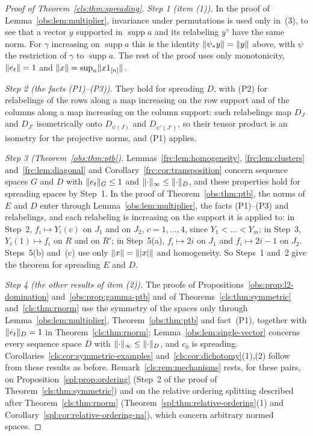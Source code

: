 \begin{proof}[Proof of Theorem~\ref{cls:thm:spreading}]
\emph{Step 1 (item (1)).} In the proof of Lemma~\ref{obs:lem:multiplier}, invariance under permutations is used only
in~(3), to see that a vector $y$ supported in $\operatorname{supp}a$ and its relabeling $y^\gamma$ have the same norm.
For $\gamma$ increasing on $\operatorname{supp}a$ this is the identity $\lVert \psi_*y\rVert=\lVert y\rVert$ above, with $\psi$ the
restriction of $\gamma$ to $\operatorname{supp}a$. The rest of the proof uses only monotonicity, $\lVert e_t\rVert=1$ and
$\lVert x\rVert=\sup_n\lVert x1_{[n]}\rVert$.

\emph{Step 2 (the facts (P1)--(P3)).} They hold for spreading $D$, with (P2) for relabelings of the rows along a map
increasing on the row support and of the columns along a map increasing on the column support: such relabelings map
$D_J$ and $D_{J'}$ isometrically onto $D_{\psi(J)}$ and $D_{\psi'(J')}$, so their tensor product is an isometry for the
projective norms, and (P1) applies.

\emph{Step 3 (Theorem~\ref{obs:thm:ptb}).} Lemmas~\ref{frc:lem:homogeneity}, \ref{frc:lem:clusters}
and~\ref{frc:lem:diagonal} and Corollary~\ref{frc:cor:transposition} concern sequence spaces $G$ and $D$ with
$\lVert e_t\rVert_G\le1$ and $\lVert \cdot\rVert_\infty\le\lVert \cdot\rVert_D$, and these properties hold for spreading spaces by Step~1. In
the proof of Theorem~\ref{obs:thm:ptb}, the norms of $E$ and $D$ enter through Lemma~\ref{obs:lem:multiplier}, the facts
(P1)--(P3) and relabelings, and each relabeling is increasing on the support it is applied to: in Step~2, $f_i\mapsto
Y_i(c)$ on $J_1$ and on $J_2$, $c=1,\dots,4$, since $Y_1<\dots<Y_m$; in Step~3, $Y_i(1)\mapsto f_i$ on $R$ and on $R'$; in
Step~5(a), $f_i\mapsto2i$ on $J_1$ and $f_i\mapsto2i-1$ on $J_2$. Steps~5(b) and~(c) use only $\lVert x\rVert=\lVert \lvert x\rvert\rVert$ and
homogeneity. So Steps~1 and~2 give the theorem for spreading $E$ and $D$.

\emph{Step 4 (the other results of item (2)).} The proofs of Propositions~\ref{obs:prop:l2-domination}
and~\ref{obs:prop:gamma-ptb} and of Theorems~\ref{cls:thm:symmetric} and~\ref{cls:thm:rnorm} use the symmetry of the
spaces only through Lemma~\ref{obs:lem:multiplier}, Theorem~\ref{obs:thm:ptb} and fact~(P1), together with
$\lVert e_t\rVert_D=1$ in Theorem~\ref{cls:thm:rnorm}; Lemma~\ref{obs:lem:single-vector} concerns every sequence space $D$ with
$\lVert \cdot\rVert_\infty\le\lVert \cdot\rVert_D$, and $c_0$ is spreading. Corollaries~\ref{cls:cor:symmetric-examples}
and~\ref{cls:cor:dichotomy}(1),(2) follow from these results as before. Remark~\ref{cls:rem:mechanisms} rests, for these
pairs, on Proposition~\ref{spl:prop:ordering} (Step~2 of the proof of Theorem~\ref{cls:thm:symmetric}) and on the
relative ordering splitting described after Theorem~\ref{cls:thm:rnorm} (Theorem~\ref{spl:thm:relative-ordering}(1) and
Corollary~\ref{spl:cor:relative-ordering-na}), which concern arbitrary normed spaces.


\end{proof}
